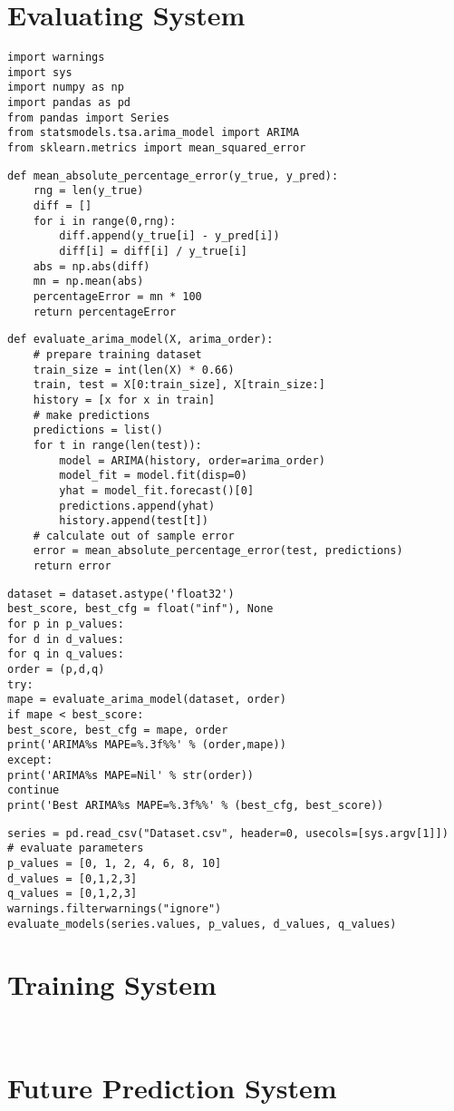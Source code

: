 
\section{Evaluating System}
\begin{lstlisting}
import warnings
import sys
import numpy as np
import pandas as pd
from pandas import Series
from statsmodels.tsa.arima_model import ARIMA
from sklearn.metrics import mean_squared_error
\end{lstlisting}

\begin{lstlisting}
def mean_absolute_percentage_error(y_true, y_pred): 
	rng = len(y_true)
	diff = []
	for i in range(0,rng):
		diff.append(y_true[i] - y_pred[i])
		diff[i] = diff[i] / y_true[i]
	abs = np.abs(diff)
	mn = np.mean(abs)
	percentageError = mn * 100
	return percentageError
\end{lstlisting}    

\begin{lstlisting}
def evaluate_arima_model(X, arima_order):
	# prepare training dataset
	train_size = int(len(X) * 0.66)
	train, test = X[0:train_size], X[train_size:]
	history = [x for x in train]
	# make predictions
	predictions = list()
	for t in range(len(test)):
		model = ARIMA(history, order=arima_order)
		model_fit = model.fit(disp=0)
		yhat = model_fit.forecast()[0]
		predictions.append(yhat)
		history.append(test[t])
	# calculate out of sample error
	error = mean_absolute_percentage_error(test, predictions)
	return error
\end{lstlisting}

\begin{lstlisting}
dataset = dataset.astype('float32')
best_score, best_cfg = float("inf"), None
for p in p_values:
for d in d_values:
for q in q_values:
order = (p,d,q)
try:
mape = evaluate_arima_model(dataset, order)
if mape < best_score:
best_score, best_cfg = mape, order
print('ARIMA%s MAPE=%.3f%%' % (order,mape))
except:
print('ARIMA%s MAPE=Nil' % str(order))
continue
print('Best ARIMA%s MAPE=%.3f%%' % (best_cfg, best_score))
\end{lstlisting}

\begin{lstlisting}
series = pd.read_csv("Dataset.csv", header=0, usecols=[sys.argv[1]])
# evaluate parameters
p_values = [0, 1, 2, 4, 6, 8, 10]
d_values = [0,1,2,3]
q_values = [0,1,2,3]
warnings.filterwarnings("ignore")
evaluate_models(series.values, p_values, d_values, q_values)
\end{lstlisting}

\section{Training System}
\begin{lstlisting}


\end{lstlisting}

\section{Future Prediction System}
\begin{lstlisting}


\end{lstlisting}